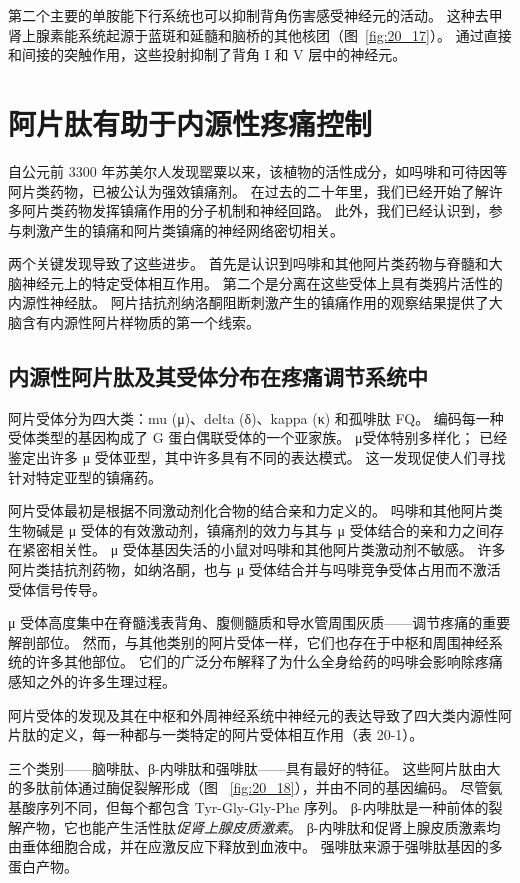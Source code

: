 第二个主要的单胺能下行系统也可以抑制背角伤害感受神经元的活动。
这种去甲肾上腺素能系统起源于蓝斑和延髓和脑桥的其他核团（图~\ref{fig:20_17}）。
通过直接和间接的突触作用，这些投射抑制了背角 I 和 V 层中的神经元。



\section{阿片肽有助于内源性疼痛控制}

自公元前 3300 年苏美尔人发现罂粟以来，该植物的活性成分，如吗啡和可待因等阿片类药物，已被公认为强效镇痛剂。
在过去的二十年里，我们已经开始了解许多阿片类药物发挥镇痛作用的分子机制和神经回路。
此外，我们已经认识到，参与刺激产生的镇痛和阿片类镇痛的神经网络密切相关。


两个关键发现导致了这些进步。
首先是认识到吗啡和其他阿片类药物与脊髓和大脑神经元上的特定受体相互作用。
第二个是分离在这些受体上具有类鸦片活性的内源性神经肽。
阿片拮抗剂纳洛酮阻断刺激产生的镇痛作用的观察结果提供了大脑含有内源性阿片样物质的第一个线索。



\subsection{内源性阿片肽及其受体分布在疼痛调节系统中}

阿片受体分为四大类：mu (μ)、delta (δ)、kappa (κ) 和孤啡肽 FQ。
编码每一种受体类型的基因构成了 G 蛋白偶联受体的一个亚家族。
μ受体特别多样化；
已经鉴定出许多 μ 受体亚型，其中许多具有不同的表达模式。
这一发现促使人们寻找针对特定亚型的镇痛药。


阿片受体最初是根据不同激动剂化合物的结合亲和力定义的。
吗啡和其他阿片类生物碱是 μ 受体的有效激动剂，镇痛剂的效力与其与 μ 受体结合的亲和力之间存在紧密相关性。
μ 受体基因失活的小鼠对吗啡和其他阿片类激动剂不敏感。
许多阿片类拮抗剂药物，如纳洛酮，也与 μ 受体结合并与吗啡竞争受体占用而不激活受体信号传导。


μ 受体高度集中在脊髓浅表背角、腹侧髓质和导水管周围灰质——调节疼痛的重要解剖部位。
然而，与其他类别的阿片受体一样，它们也存在于中枢和周围神经系统的许多其他部位。
它们的广泛分布解释了为什么全身给药的吗啡会影响除疼痛感知之外的许多生理过程。


阿片受体的发现及其在中枢和外周神经系统中神经元的表达导致了四大类内源性阿片肽的定义，每一种都与一类特定的阿片受体相互作用（表 20-1）。


三个类别——脑啡肽、β-内啡肽和强啡肽——具有最好的特征。
这些阿片肽由大的多肽前体通过酶促裂解形成（图 ~\ref{fig:20_18}），并由不同的基因编码。
尽管氨基酸序列不同，但每个都包含 Tyr-Gly-Gly-Phe 序列。
β-内啡肽是一种前体的裂解产物，它也能产生活性肽\textit{促肾上腺皮质激素}。
β-内啡肽和促肾上腺皮质激素均由垂体细胞合成，并在应激反应下释放到血液中。
强啡肽来源于强啡肽基因的多蛋白产物。


